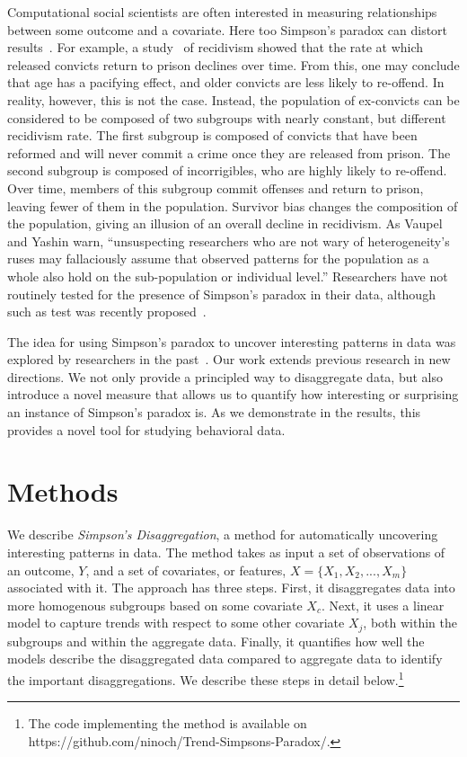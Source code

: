 \documentclass[letterpaper]{article} %
\begin{document}
Computational social scientists are often interested in measuring relationships between some outcome and a covariate. Here too Simpson's paradox can distort results~\cite{Blyth1972,Lerman2018jcss}. For example, a study~\cite{Vaupel85heterogeneity} of recidivism showed that the rate at which released convicts return to prison declines over time. From this, one may conclude that age has a pacifying effect, and older convicts are less likely to re-offend. In reality, however, this is not the case. Instead, the population of ex-convicts can be considered to be composed of two subgroups with nearly constant, but different recidivism rate. The first subgroup is composed of convicts that have been reformed and will never commit a crime once they are released from prison. The second  subgroup is composed of incorrigibles, who are highly likely to re-offend. Over time, members of this subgroup commit offenses and return to prison, leaving fewer of them in the population. Survivor bias changes the composition of the population, giving an illusion of an overall decline in recidivism. As Vaupel and Yashin warn, ``unsuspecting researchers who are not wary of heterogeneity's ruses may fallaciously assume that observed patterns for the population as a whole also hold on the sub-population or individual level.'' Researchers have not routinely tested for the presence of Simpson's paradox in their data, although such as test was recently proposed~\cite{Lerman2018jcss}.


The idea for using Simpson's paradox to uncover interesting patterns in data was explored by researchers in the past~\cite{fabris2000discovering}. Our work extends previous research in new directions. We not only provide a principled way to disaggregate data, but also introduce a novel measure that allows us to quantify how interesting or surprising an instance of Simpson's paradox is. As we demonstrate in the results, this provides a novel tool for studying behavioral data.

\section{Methods} \label{sec:methods}
We describe \emph{Simpson's Disaggregation}, a method for automatically uncovering interesting patterns in data.
The method takes as input a set of observations of an outcome, $Y$, and a set of covariates, or features, $X = \{ X_1, X_2, ..., X_m \}$ associated with it.
The approach has three steps. First, it disaggregates data into more homogenous subgroups based on some covariate $X_c$. Next, it uses a linear model to capture trends with respect to some other covariate $X_j$, both within the subgroups  and within the aggregate data. Finally, it quantifies how well the models describe the disaggregated data compared to aggregate data to identify the important disaggregations. We describe these steps in detail below.\footnote{The code implementing the method is available on https://github.com/ninoch/Trend-Simpsons-Paradox/.}
\end{document}
